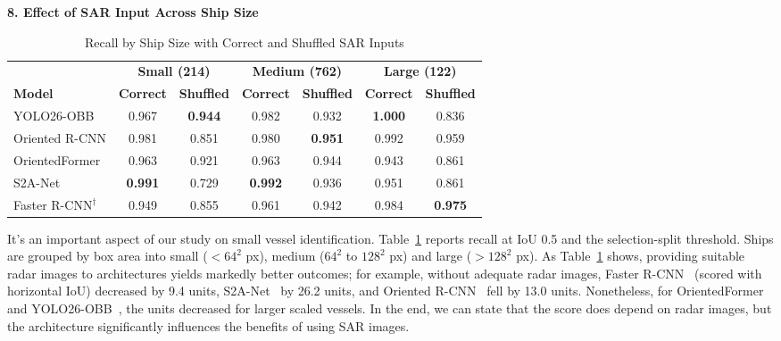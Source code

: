 \textbf{8. Effect of SAR Input Across Ship Size}
\begin{table}[htbp]
\centering
\begin{tabular}{|l|c|c|c|c|c|c|}
\hline
 & \multicolumn{2}{c|}{\textbf{Small (214)}} & \multicolumn{2}{c|}{\textbf{Medium (762)}} & \multicolumn{2}{c|}{\textbf{Large (122)}} \\
\cline{2-7}
\textbf{Model} & \textbf{Correct} & \textbf{Shuffled} & \textbf{Correct} & \textbf{Shuffled} & \textbf{Correct} & \textbf{Shuffled} \\
\hline
YOLO26-OBB             & 0.967          & \textbf{0.944} & 0.982          & 0.932          & \textbf{1.000} & 0.836          \\
Oriented R-CNN         & 0.981          & 0.851          & 0.980          & \textbf{0.951} & 0.992          & 0.959          \\
OrientedFormer         & 0.963          & 0.921          & 0.963          & 0.944          & 0.943          & 0.861          \\
S2A-Net                & \textbf{0.991} & 0.729          & \textbf{0.992} & 0.936          & 0.951          & 0.861          \\
Faster R-CNN$^\dagger$ & 0.949          & 0.855          & 0.961          & 0.942          & 0.984          & \textbf{0.975} \\
\hline

\end{tabular}

\vspace{4pt}
\caption{Recall by Ship Size with Correct and Shuffled SAR Inputs}
\label{tab:recall_size}
\end{table}

It's an important aspect of our study on small vessel identification. Table~\ref{tab:recall_size} reports recall at IoU 0.5 and the selection-split threshold. Ships are grouped by box area into small ($< 64^2$ px), medium ($64^2$ to $128^2$ px) and large ($> 128^2$ px). As Table~\ref{tab:recall_size} shows, providing suitable radar images to architectures yields markedly better outcomes; for example, without adequate radar images, Faster R-CNN~\cite{7485869} (scored with horizontal IoU) decreased by 9.4 units, S2A-Net~\cite{han2021align} by 26.2 units, and Oriented R-CNN~\cite{xie2021oriented} fell by 13.0 units. Nonetheless, for OrientedFormer~\cite{zhao2024orientedformer} and YOLO26-OBB~\cite{jocher2026ultralytics}, the units decreased for larger scaled vessels. In the end, we can state that the score does depend on radar images, but the architecture significantly influences the benefits of using SAR images.\\

